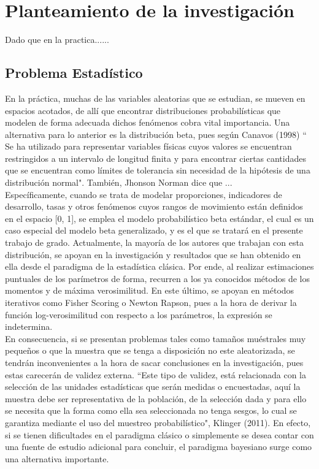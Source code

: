 \chapter{Planteamiento de la investigaci\'{o}n}
Dado que en la practica......\\

\section{Problema Estad\'{i}stico}
En la pr\'{a}ctica, muchas de las variables aleatorias que se estudian, se mueven en espacios acotados, de all\'{i} que encontrar distribuciones probabil\'{i}sticas que modelen de forma adecuada dichos fen\'{o}menos cobra vital importancia. Una alternativa para lo anterior es la distribuci\'{o}n beta, pues seg\'{u}n Canavos (1998) `` Se ha utilizado para representar variables f\'{i}sicas cuyos valores se encuentran restringidos a un intervalo de longitud finita y para encontrar ciertas cantidades que se encuentran como l\'{i}mites de tolerancia sin necesidad de la hip\'{o}tesis de una distribuci\'{o}n normal". Tambi\'{e}n, Jhonson Norman dice que ...\\

Espec\'{i}ficamente, cuando se trata de modelar proporciones, indicadores de desarrollo, tasas y otros fen\'{o}menos cuyos rangos de movimiento est\'{a}n definidos en el espacio [0, 1], se emplea el modelo probabil\'{i}stico beta est\'{a}ndar, el cual es un caso especial del modelo beta generalizado, y es el que se tratar\'{a} en el presente trabajo de grado. Actualmente, la mayor\'{i}a de los autores que trabajan con esta distribuci\'{o}n, se apoyan en la investigaci\'{o}n y resultados que se han obtenido en ella desde el paradigma de la estad\'{i}stica cl\'{a}sica. Por ende, al realizar estimaciones puntuales de los par\'{i}metros de forma, recurren a los ya conocidos m\'{e}todos de los momentos y de m\'{a}xima verosimilitud. En este \'{u}ltimo, se apoyan en m\'{e}todos iterativos como Fisher Scoring o Newton Rapson, pues a la hora de derivar la funci\'{o}n log-verosimilitud con respecto a los par\'{a}metros, la expresi\'{o}n se indetermina.\\

En consecuencia, si se presentan problemas tales como tama\~{n}os mu\'{e}strales muy peque\~{n}os o que la muestra que se tenga a disposici\'{o}n no este aleatorizada, se tendr\'{a}n inconvenientes a la hora de sacar conclusiones en la investigaci\'{o}n, pues estas carecer\'{a}n de validez externa. ``Este tipo de validez, est\'{a} relacionada con la selecci\'{o}n de las unidades estad\'{i}sticas que ser\'{a}n medidas o encuestadas, aqu\'{i} la muestra debe ser representativa de la poblaci\'{o}n, de la selecci\'{o}n dada y para ello se necesita que la forma como ella sea seleccionada no tenga sesgos, lo cual se garantiza mediante el uso del muestreo probabil\'{i}stico", Klinger (2011). En efecto, si se tienen dificultades en el paradigma cl\'{a}sico o simplemente se desea contar con una fuente de estudio adicional para concluir, el paradigma bayesiano surge como una alternativa importante.\\

